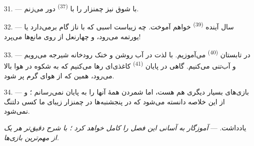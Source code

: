 \VUsaut{4.6mm}
\VUsaut{3.0mm}

31. --- با شوق نیز چمنزار را با \textsuperscript{(37)}
دور می‌زنم.

32. --- سال آینده \textsuperscript{(39)} خواهم آموخت.
چه زیباست اسبی که با ناز گام برمی‌دارد یا یورتمه می‌رود، و چهارنعل از
روی مانع‌ها می‌پرد!

33. --- در تابستان \textsuperscript{(40)} می‌آموزیم. با
لذت در آب روشن و خنک رودخانه شیرجه می‌رویم و آب‌تنی می‌کنیم. گاهی در
پایان \textsuperscript{(41)} کاغذی‌ای رها می‌کنیم که به
شکوه در هوا بالا می‌رود، همین که از هوای گرم پر شود.

34. --- بازی‌های بسیار دیگری هم هست، اما شمردن همهٔ آنها را به پایان
نمی‌رسانم ؛ و از این خلاصه دانسته می‌شود که در پنجشنبه‌ها در چمنزار
زیبای ما کسی دلتنگ نمی‌شود.

یادداشت. --- \textit{آموزگار به آسانی این فصل را کامل خواهد کرد ؛ با
شرح دقیق‌تر هر یک از مهم‌ترین بازی‌ها.}
